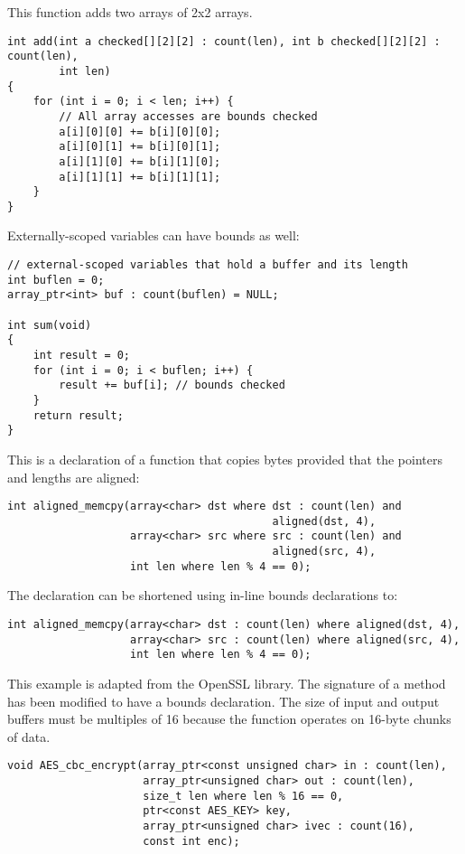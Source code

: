 This function adds two arrays of 2x2 arrays.

\begin{lstlisting}
int add(int a checked[][2][2] : count(len), int b checked[][2][2] : count(len),
        int len)
{
    for (int i = 0; i < len; i++) {
        // All array accesses are bounds checked
        a[i][0][0] += b[i][0][0];
        a[i][0][1] += b[i][0][1];
        a[i][1][0] += b[i][1][0];
        a[i][1][1] += b[i][1][1];
    }
}
\end{lstlisting}

Externally-scoped variables can have bounds as well:

\begin{lstlisting}
// external-scoped variables that hold a buffer and its length
int buflen = 0;
array_ptr<int> buf : count(buflen) = NULL;

int sum(void)
{
    int result = 0;
    for (int i = 0; i < buflen; i++) {
        result += buf[i]; // bounds checked
    }
    return result;
}
\end{lstlisting}

This is a declaration of a function that copies bytes provided that the
pointers and lengths are aligned:
\begin{lstlisting}
int aligned_memcpy(array<char> dst where dst : count(len) and
                                         aligned(dst, 4),
                   array<char> src where src : count(len) and
                                         aligned(src, 4),
                   int len where len % 4 == 0);
\end{lstlisting}

The declaration can be shortened using in-line bounds declarations to:

\begin{lstlisting}
int aligned_memcpy(array<char> dst : count(len) where aligned(dst, 4),
                   array<char> src : count(len) where aligned(src, 4),
                   int len where len % 4 == 0);
\end{lstlisting}

This example is adapted from the OpenSSL library. The signature of a
method has been modified to have a bounds declaration. The size of input
and output buffers must be multiples of 16 because the function operates
on 16-byte chunks of data.

\begin{lstlisting}
void AES_cbc_encrypt(array_ptr<const unsigned char> in : count(len),
                     array_ptr<unsigned char> out : count(len),
                     size_t len where len % 16 == 0,
                     ptr<const AES_KEY> key,
                     array_ptr<unsigned char> ivec : count(16),
                     const int enc);
\end{lstlisting}

